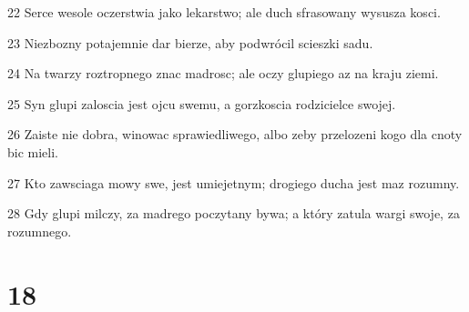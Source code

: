 \par 22 Serce wesole oczerstwia jako lekarstwo; ale duch sfrasowany wysusza kosci.
\par 23 Niezbozny potajemnie dar bierze, aby podwrócil scieszki sadu.
\par 24 Na twarzy roztropnego znac madrosc; ale oczy glupiego az na kraju ziemi.
\par 25 Syn glupi zaloscia jest ojcu swemu, a gorzkoscia rodzicielce swojej.
\par 26 Zaiste nie dobra, winowac sprawiedliwego, albo zeby przelozeni kogo dla cnoty bic mieli.
\par 27 Kto zawsciaga mowy swe, jest umiejetnym; drogiego ducha jest maz rozumny.
\par 28 Gdy glupi milczy, za madrego poczytany bywa; a który zatula wargi swoje, za rozumnego.

\chapter{18}

